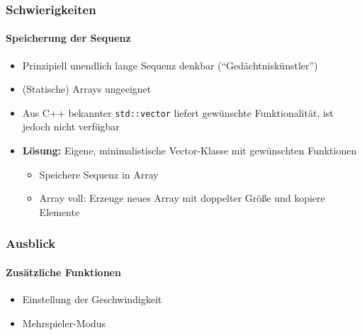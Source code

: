 \documentclass[xcolor=dvipsnames,10pt]{beamer}
\begin{document}

\begin{frame}[fragile]\frametitle{Schwierigkeiten}\framesubtitle{Speicherung der Sequenz}
	\begin{itemize}\itemsep3ex
		\item Prinzipiell unendlich lange Sequenz denkbar ("`Gedächtniskünstler"')
		\item (Statische) Arrays ungeeignet
		\item Aus C++ bekannter \verb|std::vector| liefert gewünschte Funktionalität, ist jedoch nicht verfügbar
		\item \textbf{Lösung:} Eigene, minimalistische Vector-Klasse mit gewünschten Funktionen
		\begin{itemize}\itemsep1ex
			\item Speichere Sequenz in Array
			\item Array voll: Erzeuge neues Array mit doppelter Größe und kopiere Elemente 
		\end{itemize}
	\end{itemize}

	
	
\end{frame}






\begin{frame}\frametitle{Ausblick}\framesubtitle{Zusätzliche Funktionen}
	\begin{itemize}\itemsep3ex
		\item Einstellung der Geschwindigkeit
		\item Mehrspieler-Modus
	\end{itemize}

\end{frame}
\end{document}
